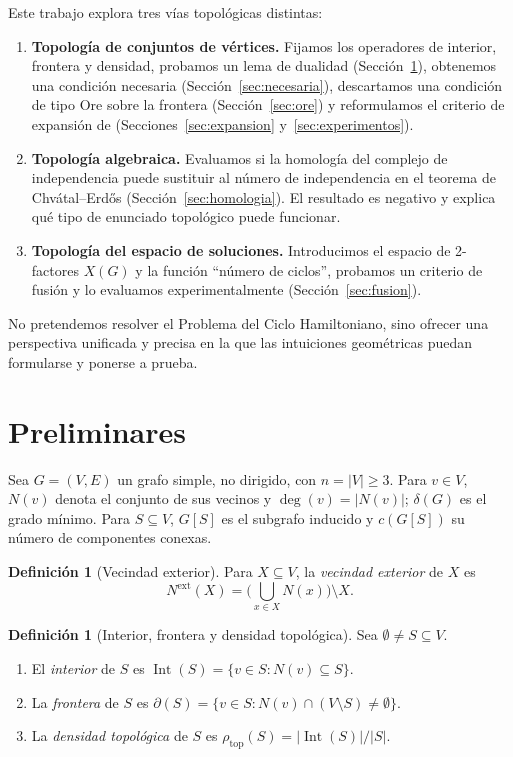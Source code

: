 \documentclass[11pt,a4paper]{article}
\theoremstyle{definition}
\newtheorem{definicion}[teorema]{Definición}
\theoremstyle{remark}
\newcommand{\Int}{\operatorname{Int}}
\newcommand{\rtop}{\rho_{\mathrm{top}}}
\newcommand{\Nx}{N^{\mathrm{ext}}}
\begin{document}
Este trabajo explora tres vías topológicas distintas:
\begin{enumerate}[label=(\alph*)]
\item \textbf{Topología de conjuntos de vértices.} Fijamos los operadores de interior, frontera y densidad, probamos un lema de dualidad (Sección~\ref{sec:prelim}), obtenemos una condición necesaria (Sección~\ref{sec:necesaria}), descartamos una condición de tipo Ore sobre la frontera (Sección~\ref{sec:ore}) y reformulamos el criterio de expansión de \cite{dmmps} (Secciones~\ref{sec:expansion} y~\ref{sec:experimentos}).
\item \textbf{Topología algebraica.} Evaluamos si la homología del complejo de independencia puede sustituir al número de independencia en el teorema de Chvátal--Erdős (Sección~\ref{sec:homologia}). El resultado es negativo y explica qué tipo de enunciado topológico puede funcionar.
\item \textbf{Topología del espacio de soluciones.} Introducimos el espacio de 2-factores $X(G)$ y la función ``número de ciclos'', probamos un criterio de fusión y lo evaluamos experimentalmente (Sección~\ref{sec:fusion}).
\end{enumerate}
No pretendemos resolver el Problema del Ciclo Hamiltoniano, sino ofrecer una perspectiva unificada y precisa en la que las intuiciones geométricas puedan formularse y ponerse a prueba.

\section{Preliminares}\label{sec:prelim}

Sea $G=(V,E)$ un grafo simple, no dirigido, con $n=|V|\ge 3$. Para $v\in V$, $N(v)$ denota el conjunto de sus vecinos y $\deg(v)=|N(v)|$; $\delta(G)$ es el grado mínimo. Para $S\subseteq V$, $G[S]$ es el subgrafo inducido y $c(G[S])$ su número de componentes conexas.

\begin{definicion}[Vecindad exterior]
Para $X\subseteq V$, la \emph{vecindad exterior} de $X$ es
\[
\Nx(X)=\Big(\bigcup_{x\in X}N(x)\Big)\setminus X .
\]
\end{definicion}

\begin{definicion}[Interior, frontera y densidad topológica]
Sea $\emptyset\neq S\subseteq V$.
\begin{enumerate}
\item El \emph{interior} de $S$ es $\Int(S)=\{v\in S : N(v)\subseteq S\}$.
\item La \emph{frontera} de $S$ es $\partial(S)=\{v\in S : N(v)\cap(V\setminus S)\neq\emptyset\}$.
\item La \emph{densidad topológica} de $S$ es $\rtop(S)=|\Int(S)|/|S|$.
\end{enumerate}
\end{definicion}
\end{document}

